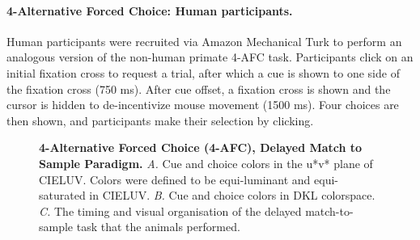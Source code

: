 \paragraph{4-Alternative Forced Choice: Human participants.} Human participants were recruited via Amazon Mechanical Turk to perform an analogous version of the non-human primate 4-AFC task. Participants click on an initial fixation cross to request a trial, after which a cue is shown to one side of the fixation cross (750 ms). After cue offset, a fixation cross is shown and the cursor is hidden to de-incentivize mouse movement (1500 ms). Four choices are then shown, and participants make their selection by clicking. 


\begin{figure}

\caption{\textbf{4-Alternative Forced Choice (4-AFC), Delayed Match to Sample Paradigm.}
\emph{A.} Cue and choice colors in the u*v* plane of CIELUV. Colors were defined to be equi-luminant and equi-saturated in CIELUV.
\emph{B.} Cue and choice colors in DKL colorspace.
\emph{C.} The timing and visual organisation of the delayed match-to-sample task that the animals performed.
} 
\label{fig:StimuliAndParadigm}
\end{figure}





